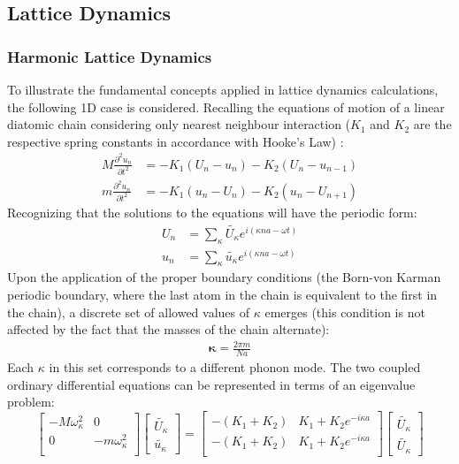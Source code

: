 \subsection{Lattice Dynamics}
\subsubsection{Harmonic Lattice Dynamics}
To illustrate the fundamental concepts applied in lattice dynamics calculations, the following 1D case is considered. Recalling the equations of motion of a linear diatomic chain considering only nearest neighbour interaction ($K_1$ and $K_2$ are the respective spring constants in accordance with Hooke's Law) \cite{dove_introduction_1993-3}:
%
\begin{align}
	M\frac{\partial ^2 u_n}{\partial t^2}&=-K_1(U_n-u_n)-K_2(U_n-u_{n-1})\\
	m\frac{\partial ^2 u_n}{\partial t^2}&=-K_1(u_n-U_n)-K_2(u_n-U_{n+1})
\end{align}
%
Recognizing that the solutions to the equations will have the periodic form:
%
\begin{align}
	U_n&=\sum_\kappa \tilde{U_\kappa}e^{i(\kappa na-\omega t)}\\
	u_n&=\sum_\kappa \tilde{u_\kappa}e^{i(\kappa na-\omega t)}
\end{align}
%
Upon the application of the proper boundary conditions (the Born-von Karman periodic boundary, where the last atom in the chain is equivalent to the first in the chain), a discrete set of allowed values of $\kappa$ emerges (this condition is not affected by the fact that the masses of the chain alternate):
%
\begin{align}
	\pmb{\kappa}=\frac{2\pi m}{Na}
\end{align}
%
Each $\kappa$ in this set corresponds to a different phonon mode. The two coupled ordinary differential equations can be represented in terms of an eigenvalue problem:
%
\begin{equation}
\begin{bmatrix}
  -M\omega_\kappa^2 & 0\\
  0 & -m\omega_\kappa^2\\ 
 \end{bmatrix}
\begin{bmatrix}
\tilde{U_\kappa} \\ 
\tilde{u_\kappa}
\end{bmatrix}
=
\begin{bmatrix}
  -(K_1+K_2) & K_1+K_2e^{-i\kappa a}\\
  -(K_1+K_2) & K_1+K_2e^{-i\kappa a}\\ 
 \end{bmatrix}
\begin{bmatrix}
\tilde{U_\kappa} \\ \tilde{U_\kappa}
\end{bmatrix}
\end{equation}
